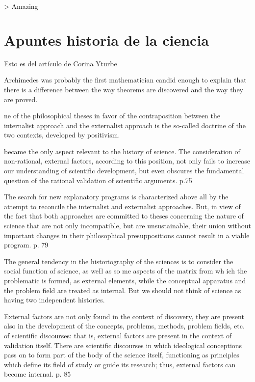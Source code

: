 > Amazing



\section{Apuntes historia de la ciencia}

Esto es del artículo de Corina Yturbe %

Archimedes was probably the first mathematician candid enough to explain that
there is a difference between the way theorems are discovered and the way they
are proved.

ne of the philosophical theses in favor of the contraposition between the
internalist approach and the externalist approach is the so-called doctrine of
the two contexts, developed by positivism.

became the only aspect relevant to the history of science. The consideration of
non-rational, external factors, according to this position, not only fails to
increase our understanding of scientific development, but even obscures the
fundamental question of the rational validation of scientific arguments. p.75

The search for new explanatory programs is characterized above all by the
attempt to reconcile the internalist and externalist approaches. But, in view of
the fact that both approaches are committed to theses concerning the nature of
science that are not only incompatible, but are unsustainable, their union
without important changes in their philosophical presuppositions cannot result
in a viable program. p. 79

The general tendency in the historiography of the sciences is to consider the
social function of science, as weIl as so me aspects of the matrix from wh ich
the problematic is formed, as external elements, while the conceptual apparatus
and the problem field are treated as internal. But we should not think of
science as having two independent histories.

External factors are not only found in the context of discovery, they are
present also in the development of the concepts, problems, methods, problem
fields, etc. of scientific discourses: that is, external factors are present in
the context of validation itself. There are scientific discourses in which
ideological conceptions pass on to form part of the body of the science itself,
functioning as principles which define its field of study or guide its research;
thus, external factors can become internal. p. 85

